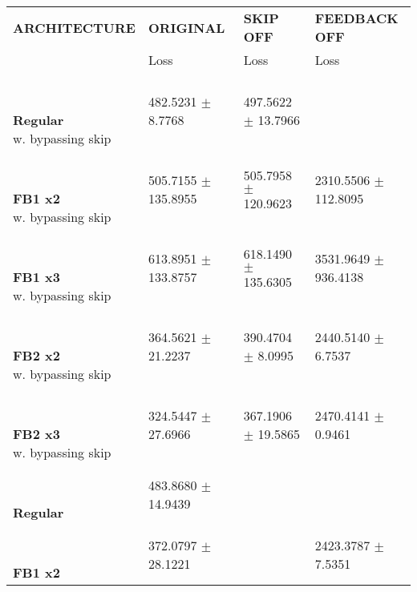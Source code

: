 
\begin{table}[ht]
    \centering
    \begin{tabular}{|>{\columncolor{gray!05}}l|l|l|l|}
        \hline
        \rowcolor{gray!20}
        \textbf{\footnotesize ARCHITECTURE} & \textbf{\footnotesize ORIGINAL} & \textbf{\footnotesize SKIP OFF} & \textbf{\footnotesize FEEDBACK OFF} \\

        \rowcolor{gray!20}
        & {\footnotesize Loss} & {\footnotesize Loss} & {\footnotesize Loss} \\
        \hline
\shortstack[l]{\\ {} \\ \textbf{Regular}\\{w. bypassing skip}} & 482.5231 $\pm$ 8.7768 & 497.5622 $\pm$ 13.7966 &  \\
 \hline 
\shortstack[l]{\\ {} \\ \textbf{FB1 x2}\\{w. bypassing skip}} & 505.7155 $\pm$ 135.8955 & 505.7958 $\pm$ 120.9623 & 2310.5506 $\pm$ 112.8095 \\
 \hline 
\shortstack[l]{\\ {} \\ \textbf{FB1 x3}\\{w. bypassing skip}} & 613.8951 $\pm$ 133.8757 & 618.1490 $\pm$ 135.6305 & 3531.9649 $\pm$ 936.4138 \\
 \hline 
\shortstack[l]{\\ {} \\ \textbf{FB2 x2}\\{w. bypassing skip}} & 364.5621 $\pm$ 21.2237 & 390.4704 $\pm$ 8.0995 & 2440.5140 $\pm$ 6.7537 \\
 \hline 
\shortstack[l]{\\ {} \\ \textbf{FB2 x3}\\{w. bypassing skip}} & 324.5447 $\pm$ 27.6966 & 367.1906 $\pm$ 19.5865 & 2470.4141 $\pm$ 0.9461 \\
 \hline 
\shortstack[l]{\\ {} \\ \textbf{Regular}\\{}} & 483.8680 $\pm$ 14.9439 &  &  \\
 \hline 
\shortstack[l]{\\ {} \\ \textbf{FB1 x2}\\{}} & 372.0797 $\pm$ 28.1221 &  & 2423.3787 $\pm$ 7.5351 \\

\end{tabular}
\end{table}

